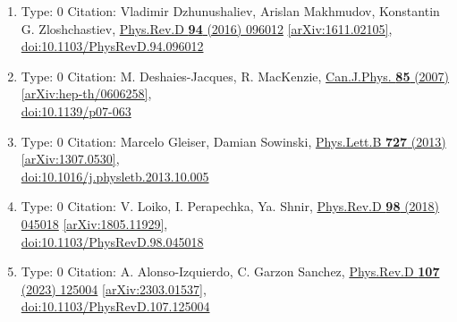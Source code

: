 \documentclass[a4paper,10pt]{article}
\begin{document}
\begin{enumerate}
\begin{enumerate}
  \item Type: 0 Citation: Vladimir Dzhunushaliev, Arislan Makhmudov, Konstantin G. Zloshchastiev, \href{https://www.doi.org/10.1103/PhysRevD.94.096012}{Phys.Rev.D {\bf 94} (2016) 096012}  \href{https://arxiv.org/abs/1611.02105}{[arXiv:1611.02105]},\\\href{https://www.doi.org/10.1103/PhysRevD.94.096012}{doi:10.1103/PhysRevD.94.096012}
  \item Type: 0 Citation: M. Deshaies-Jacques, R. MacKenzie, \href{https://www.doi.org/10.1139/p07-063}{Can.J.Phys. {\bf 85} (2007) }  \href{https://arxiv.org/abs/hep-th/0606258}{[arXiv:hep-th/0606258]},\\\href{https://www.doi.org/10.1139/p07-063}{doi:10.1139/p07-063}
  \item Type: 0 Citation: Marcelo Gleiser, Damian Sowinski, \href{https://www.doi.org/10.1016/j.physletb.2013.10.005}{Phys.Lett.B {\bf 727} (2013) }  \href{https://arxiv.org/abs/1307.0530}{[arXiv:1307.0530]},\\\href{https://www.doi.org/10.1016/j.physletb.2013.10.005}{doi:10.1016/j.physletb.2013.10.005}
  \item Type: 0 Citation: V. Loiko, I. Perapechka, Ya. Shnir, \href{https://www.doi.org/10.1103/PhysRevD.98.045018}{Phys.Rev.D {\bf 98} (2018) 045018}  \href{https://arxiv.org/abs/1805.11929}{[arXiv:1805.11929]},\\\href{https://www.doi.org/10.1103/PhysRevD.98.045018}{doi:10.1103/PhysRevD.98.045018}
  \item Type: 0 Citation: A. Alonso-Izquierdo, C. Garzon Sanchez, \href{https://www.doi.org/10.1103/PhysRevD.107.125004}{Phys.Rev.D {\bf 107} (2023) 125004}  \href{https://arxiv.org/abs/2303.01537}{[arXiv:2303.01537]},\\\href{https://www.doi.org/10.1103/PhysRevD.107.125004}{doi:10.1103/PhysRevD.107.125004}

\end{enumerate}
\end{enumerate}
\end{document}
